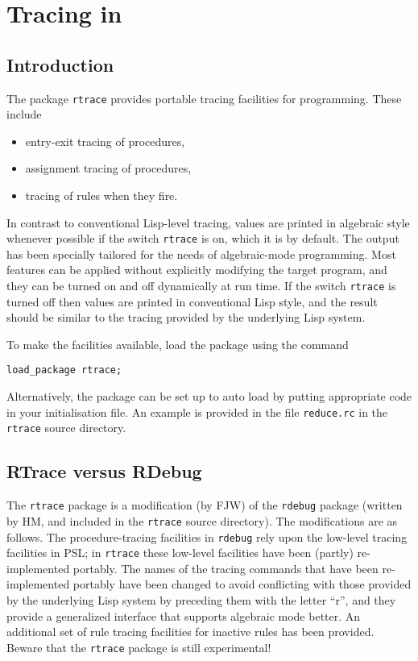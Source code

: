 \chapter{Tracing in \REDUCE}
\newcommand{\rdebug}{\texttt{rdebug}}
\newcommand{\rtrace}{\texttt{rtrace}}


\section{Introduction}

The package \rtrace{} provides portable tracing facilities for
\REDUCE{} programming.  These include
\begin{itemize}
\item entry-exit tracing of procedures,
\item assignment tracing of procedures,
\item tracing of rules when they fire.
\end{itemize}
In contrast to conventional Lisp-level tracing, values are printed in
algebraic style whenever possible if the switch \rtrace{} is
on, which
it is by default.  The output has been specially tailored for the
needs of algebraic-mode programming.  Most features can be applied
without explicitly modifying the target program, and they can be
turned on and off dynamically at run time.  If the switch \rtrace{} is
turned off then values are printed in conventional Lisp style, and the
result should be similar to the tracing provided by the underlying
Lisp system.

To make the facilities available, load the package using the command
\begin{verbatim}
load_package rtrace;
\end{verbatim}
Alternatively, the package can be set up to auto load by putting
appropriate code in your \REDUCE{} initialisation file.  An example is
provided in the file \texttt{reduce.rc} in the \rtrace{} source
directory.

\section{RTrace versus RDebug}

The \rtrace{} package is a modification (by FJW) of the \rdebug{}
package (written by HM, and included in the \rtrace{} source
directory).  The modifications are as follows.  The procedure-tracing
facilities in \rdebug{} rely upon the low-level tracing facilities in
PSL; in \rtrace{} these low-level facilities have been (partly)
re-implemented portably.  The names of the tracing commands that have
been re-implemented portably have been changed to avoid conflicting
with those provided by the underlying Lisp system by preceding them
with the letter ``r'', and they provide a generalized interface that
supports algebraic mode better.  An additional set of rule tracing
facilities for inactive rules has been provided.  Beware that the
\rtrace{} package is still experimental!

